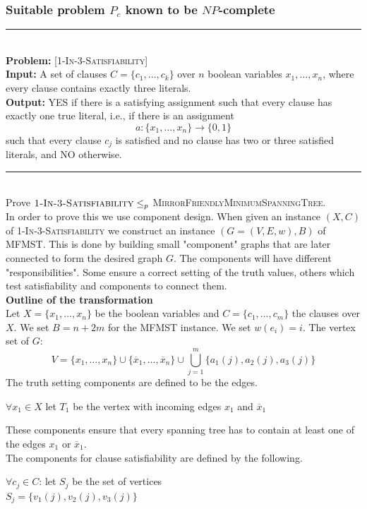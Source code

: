 \documentclass[12pt]{report}
\newcommand{\HRule}{\rule{\linewidth}{0.075mm}}
\begin{document}
\subsubsection*{Suitable problem $P_c$ known to be $NP$-complete}
\HRule\\
\textbf{Problem:} \textsc{[1-In-3-Satisfiability]}\\
\textbf{Input:} A set of clauses $C = \{c_1,\dots,c_k\}$ over $n$ boolean variables $x_1,\dots,x_n$, where every clause contains exactly three literals.\\
\textbf{Output:} YES if there is a satisfying assignment such that every clause has exactly one true literal, i.e., if there is an assignment
$$a: \{x_1,\dots,x_n\} \rightarrow \{0,1\}$$
such that every clause $c_j$ is satisfied and no clause has two or three satisfied literals, and NO otherwise.\\
\HRule\\
Prove $\textsc{1-In-3-Satisfiability} \leq_p$ \textsc{MirrorFriendlyMinimumSpanningTree}.\\
In order to prove this we use component design. When given an instance $(X,C)$ of \textsc{1-In-3-Satisfiability} we construct an instance $(G = (V, E,w),B)$ of MFMST. This is done by building small "component" graphs that are later connected to form the desired graph $G$. The components will have different "responsibilities". Some ensure a correct setting of the truth values, others which test satisfiability and components to connect them.
\\[0.25cm]\textbf{Outline of the transformation}\\
Let $X = \{x_1,\dots,x_n\}$ be the boolean variables and $C = \{c_1,\dots,c_m\}$ the clauses over $X$. We set $B = n + 2m$ for the MFMST instance. We set $w(e_i) = i$. The vertex set of $G$:
$$V = \{x_1,\dots,x_n\} \cup \{\overline{x}_1,\dots,\overline{x}_n\} \cup \bigcup_{j=1}^{m}{\{a_1(j),a_2(j),a_3(j)\}}$$
The truth setting components are defined to be the edges.
\begin{center}
$\forall x_1 \in X$ let $T_1$ be the vertex with incoming edges $x_1$ and $\overline{x}_1$
\end{center}
These components ensure that every spanning tree has to contain at least one of the edges $x_1$ or $\overline{x}_1$.\\
The components for clause satisfiability are defined by the following.
\begin{center}
$\forall c_j \in C$: let $S_j$ be the set of vertices\\
$S_j  = \{v_1(j),v_2(j),v_3(j)\}$
\end{center}
\end{document}
